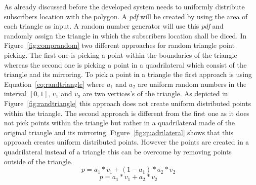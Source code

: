 \documentclass[master,english]{hgbthesis}
\begin{document}
As already discussed before the developed system needs to uniformly distribute subscribers location with the polygon. A \emph{pdf} will be created by using the area of each triangle as input. A random number generator will use this \emph{pdf} and randomly assign the triangle in which the subscribers location shall be diced.
In Figure~\ref{fig:comprandom} two different approaches for random triangle point picking. The first one is picking a point within the boundaries of the triangle whereas the second one is picking a  point in a  quadrilateral which consist of the triangle and its mirroring. To pick a point in a triangle the first approach is using Equation~\ref{eq:randtriangle} where $a_1$ and $a_2$ are uniform random numbers in the interval $ \left[0,1 \right] $, $v_1$ and $v_2$ are two vertices's of the triangle. As depicted in Figure~\ref{fig:randtriangle} this approach does not create uniform distributed points within the triangle. The second approach is different from the first one as it does not pick points within the triangle but rather in a quadrilateral made of the original triangle and its mirroring. Figure~\ref{fig:quadrilateral} shows that this approach creates uniform distributed points. However the points are created in a quadrilateral instead of a triangle this can be overcome by removing points outside of the triangle.
\begin{equation}
	p=a_1*v_1+(1-a_1)*a_2*v_2
	\label{eq:randtriangle}
\end{equation}
\begin{equation}
	p=a_1*v_1+a_2*v_2
	\label{eq:randquad}
\end{equation}
\end{document}
